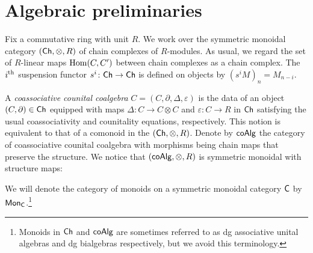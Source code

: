 
\section{Algebraic preliminaries}

Fix a commutative ring with unit $R$. 
We work over the symmetric monoidal category $(\mathsf{Ch}, \otimes, R)$ of chain complexes of $R$-modules.
As usual, we regard the set of $R$-linear maps $\mathrm{Hom}(C, C^\prime)$ between chain complexes as a chain complex.
The $i^\mathrm{th}$ suspension functor $s^i \colon \mathsf{Ch} \to \mathsf{Ch}$ is defined on objects by $(s^{i}M)_n= M_{n-i}$.

A \textit{coassociative counital coalgebra} $C = (C, \partial, \Delta, \varepsilon)$ is the data of an object $(C, \partial) \in \mathsf{Ch}$ equipped with maps $\Delta \colon C \to C \otimes C$ and $\varepsilon \colon C\to R$ in $\mathsf{Ch}$ satisfying the usual coassociativity and counitality equations, respectively. 
This notion is equivalent to that of a comonoid in the $(\mathsf{Ch}, \otimes, R)$. Denote by $\mathsf{coAlg}$ the category of coassociative counital coalgebra with morphisms being chain maps that preserve the structure. 
We notice that $(\mathsf{coAlg}, \otimes, R)$ is symmetric monoidal with structure maps:
\begin{center}
 \par
{}
\end{center}
We will denote the category of monoids on a symmetric monoidal category $\mathsf{C}$ by $\mathsf{Mon}_{\mathsf{C}}$.\footnote{Monoids in $\mathsf{Ch}$ and $\mathsf{coAlg}$ are sometimes referred to as dg associative unital algebras and dg bialgebras respectively, but we avoid this terminology.}




